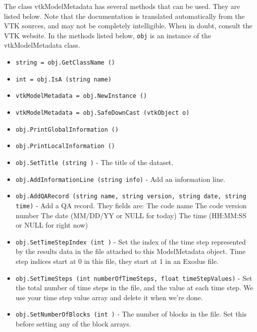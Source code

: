 The class vtkModelMetadata has several methods that can be used.
  They are listed below.
Note that the documentation is translated automatically from the VTK sources,
and may not be completely intelligible.  When in doubt, consult the VTK website.
In the methods listed below, \verb|obj| is an instance of the vtkModelMetadata class.
\begin{itemize}
\item  \verb|string = obj.GetClassName ()|

\item  \verb|int = obj.IsA (string name)|

\item  \verb|vtkModelMetadata = obj.NewInstance ()|

\item  \verb|vtkModelMetadata = obj.SafeDownCast (vtkObject o)|

\item  \verb|obj.PrintGlobalInformation ()|

\item  \verb|obj.PrintLocalInformation ()|

\item  \verb|obj.SetTitle (string )| -    The title of the dataset.

\item  \verb|obj.AddInformationLine (string info)| -    Add an information line. 

\item  \verb|obj.AddQARecord (string name, string version, string date, string time)| -    Add a QA record.  They fields are:
    The code name
    The code version number
    The date (MM/DD/YY or NULL for today)
    The time (HH:MM:SS or NULL for right now)

\item  \verb|obj.SetTimeStepIndex (int )| -     Set the index of the time step represented by the results
    data in the file attached to this ModelMetadata object.  Time
    step indices start at 0 in this file, they start at 1 in
    an Exodus file.

\item  \verb|obj.SetTimeSteps (int numberOfTimeSteps, float timeStepValues)| -     Set the total number of time steps in the file,
    and the value at each time step.  We use your time
    step value array and delete it when we're done.

\item  \verb|obj.SetNumberOfBlocks (int )| -    The number of blocks in the file.  Set this before setting
   any of the block arrays.


\end{itemize}
